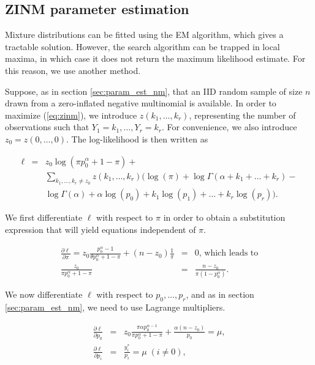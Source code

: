 \documentclass[12pt]{article}
\begin{document}
\begin{appendices}
\subsection{ZINM parameter estimation}
\label{sec:zinm_parameter_est}

    Mixture distributions can be fitted using the EM algorithm,
    which gives a tractable solution. However,
    the search algorithm can be trapped in local maxima, in which
    case it does not return the maximum likelihood estimate. For
    this reason, we use another method.

    Suppose, as in section \ref{sec:param_est_nm}, that an IID random
    sample of size $n$ drawn from a zero-inflated negative multinomial
    is available. In order to maximize (\ref{eq:zinm}), we introduce
    $z(k_1, \ldots, k_r)$, representing the number of observations
    such that $Y_1 = k_1, \ldots, Y_r = k_r$. For convenience, we
    also introduce $z_0 = z(0, \ldots, 0)$. The log-likelihood
    is then written as

    \begin{eqnarray*}
      \ell &=& z_0 \log(\pi p_0^{\alpha}+1-\pi) + \\
      &\;&\sum_{k_1, \ldots, k_r \neq z_0}z(k_1, \ldots,k_r)
      \Big( \log(\pi) + \log \Gamma(\alpha+k_1+\ldots+k_r) - \\
      &\;&\log \Gamma(\alpha) +  \alpha \log(p_0) +
      k_1\log(p_1) + \ldots + k_r\log(p_r) \Big).
    \end{eqnarray*}

    We first differentiate $\ell$ with respect to $\pi$ in order
    to obtain a substitution expression that will yield equations
    independent of $\pi$.

    \begin{eqnarray}
      \frac{\partial\ell}{\partial\pi} =
      z_0 \frac{p_0^{\alpha}-1}{\theta p_0^{\alpha}+1-\pi}
      + (n-z_0)\frac{1}{\pi} &=& 0
      \mbox{, which leads to} \nonumber \\
\label{eq:sub_pi}
\frac{z_0}{\pi p_0^{\alpha}+1-\pi} &=&
      \frac{n-z_0}{\pi(1-p_0^{\alpha})}.
    \end{eqnarray}

    We now differentiate $\ell$ with respect to $p_0, \ldots, p_r$,
    and as in section \ref{sec:param_est_nm}, we need to use Lagrange
    multipliers.

    \begin{eqnarray}
      \frac{\partial\ell}{\partial p_0} &=&
      z_0 \frac{\pi \alpha p_0^{\alpha-1}}
      {\pi p_0^{\alpha}+1-\pi} +
      \frac{\alpha(n-z_0)}{p_0} = \mu, \nonumber \\
      \frac{\partial\ell}{\partial p_i} &=&
      \frac{y_i^*}{p_i} = \mu \; (i \neq 0),
    \end{eqnarray}


\end{appendices}
\end{document}
